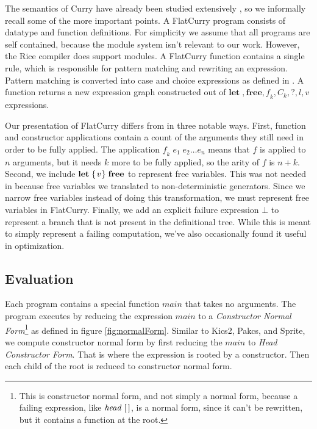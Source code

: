 \documentclass{book}
\theoremstyle{definition}
\newcommand{\Conid}[1]{\mathit{#1}}
\newcommand{\Varid}[1]{\mathit{#1}}
\begin{document}
The semantics of Curry have already been studied extensively \cite{currySemantics},
so we informally recall some of the more important points.
A FlatCurry program consists of datatype and function definitions.
For simplicity we assume that all programs are self contained,
because the module system isn't relevant to our work.
However, the Rice compiler does support modules.
A FlatCurry function contains a single rule, 
which is responsible for pattern matching and rewriting an expression.
Pattern matching is converted into case and choice expressions as defined in \cite{currySemantics}.
A function returns a new expression graph constructed out of \ensuremath{\mathbf{let}\;,\textbf{free} ,\Varid{f}_{\Varid{k}},\Conid{C}_{\Varid{k}},\mathbin{?},\Varid{l},\Varid{v}}
expressions.

Our presentation of FlatCurry differs from \cite{currySemantics} in three notable ways.
First, function and constructor applications
contain a count of the arguments they still need in order to be fully applied.
The application \ensuremath{\Varid{f}_{\Varid{k}}\;\Varid{e}_{\mathrm{1}}\;\Varid{e}_{\mathrm{2}}\ldots \Varid{e}_{\Varid{n}}} means that \ensuremath{\Varid{f}} is applied to \ensuremath{\Varid{n}} arguments,
but it needs \ensuremath{\Varid{k}} more to be fully applied,
so the arity of \ensuremath{\Varid{f}} is \ensuremath{\Varid{n}\mathbin{+}\Varid{k}}.
Second, we include \ensuremath{\mathbf{let}\;\{\mskip1.5mu \Varid{v}\mskip1.5mu\}\;\textbf{free} } to represent free variables.
This was not needed in \cite{currySemantics, kics2} because free variables we translated
to non-deterministic generators.
Since we narrow free variables instead of doing this transformation, 
we must represent free variables in FlatCurry.
Finally, we add an explicit failure expression \ensuremath{\bot } to represent a branch
that is not present in the definitional tree.
While this is meant to simply represent a failing computation,
we've also occasionally found it useful in optimization.

\subsection{Evaluation} \label{Evaluation}

Each program contains a special function \ensuremath{\Varid{main}} that takes no arguments.
The program executes by reducing the expression \ensuremath{\Varid{main}} 
to a \emph{Constructor Normal 
Form}\footnote{This is constructor normal form, and not simply a normal form,
              because a failing expression, like \ensuremath{\Varid{head}\;[\mskip1.5mu \mskip1.5mu]}, is a normal form,
              since it can't be rewritten, but it contains a function at the root.} 
as defined in figure \ref{fig:normalForm}.
Similar to Kics2, Pakcs, and Sprite, \cite{kics2, pakcs, sprite}
we compute constructor normal form by first reducing the \ensuremath{\Varid{main}} to 
\emph{Head Constructor Form}.
That is where the expression is rooted by a constructor.
Then each child of the root is reduced to constructor normal form.
\end{document}
